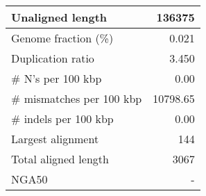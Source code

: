 \documentclass[12pt,a4paper]{article}
\begin{document}
\begin{table}[ht]
\begin{center}
\begin{tabular}{|l*{1}{|r}|}
Unaligned length & 136375 \\ \hline
Genome fraction (\%) & 0.021 \\ \hline
Duplication ratio & 3.450 \\ \hline
\# N's per 100 kbp & 0.00 \\ \hline
\# mismatches per 100 kbp & 10798.65 \\ \hline
\# indels per 100 kbp & 0.00 \\ \hline
Largest alignment & 144 \\ \hline
Total aligned length & 3067 \\ \hline
NGA50 & - \\ \hline
\end{tabular}
\end{center}
\end{table}
\end{document}
